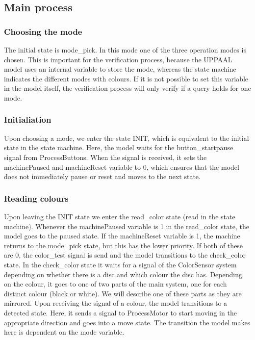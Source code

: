 \documentclass[a4paper,oneside,11pt]{article}
\begin{document}
\subsection{Main process}
\subsubsection{Choosing the mode}
The initial state is mode\_pick. In this mode one of the three operation modes is chosen. This is important for the verification process, because the UPPAAL model uses an internal variable to store the mode, whereas the state machine indicates the different modes with colours. If it is not possible to set this variable in the model itself, the verification process will only verify if a query holds for one mode.

\subsubsection{Initialiation}
Upon choosing a mode, we enter the state INIT, which is equivalent to the initial state in the state machine. Here, the model waits for the button\_startpause signal from ProcessButtons. When the signal is received, it sets the machinePaused and machineReset variable to 0, which ensures that the model does not immediately pause or reset and moves to the next state.

\subsubsection{Reading colours}
Upon leaving the INIT state we enter the read\_color state (read in the state machine). Whenever the machinePaused variable is 1 in the read\_color state, the model goes to the paused state. If the machineReset variable is 1, the machine returns to the mode\_pick state, but this has the lower priority. If both of these are 0, the color\_test signal is send and the model transitions to the check\_color state.  In the check\_color state it waits for a signal of the ColorSensor system depending on whether there is a disc and which colour the disc has. Depending on the colour, it goes to one of two parts of the main system, one for each distinct colour (black or white). We will describe one of these parts as they are mirrored. Upon receiving the signal of a colour, the model transitions to a detected state. Here, it sends a signal to ProcessMotor to start moving in the appropriate direction and goes into a move state. The transition the model makes here is dependent on the mode variable.
\end{document}
